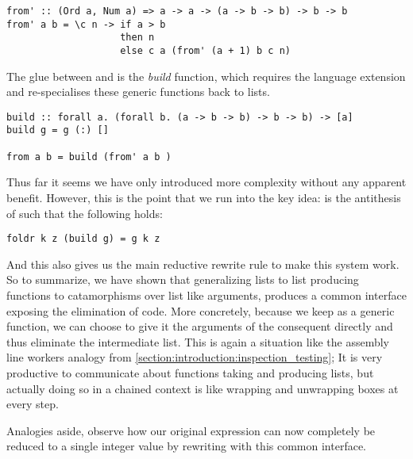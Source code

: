 \begin{listing}[H]
\begin{verbatim}
from' :: (Ord a, Num a) => a -> a -> (a -> b -> b) -> b -> b
from' a b = \c n -> if a > b
                    then n
                    else c a (from' (a + 1) b c n)
\end{verbatim}
\end{listing}

The glue between  and  is the \textit{build} function, which requires the  language extension
and re-specialises these generic functions back to lists.

\begin{listing}[H]
\begin{verbatim}
build :: forall a. (forall b. (a -> b -> b) -> b -> b) -> [a]
build g = g (:) []

from a b = build (from' a b )
\end{verbatim}
\end{listing}

Thus far it seems we have only introduced more complexity without any apparent benefit. 
However, this is the point that we run into the key idea:  is the antithesis of  such that the following holds:

\begin{listing}[H]
\begin{verbatim}
foldr k z (build g) = g k z
\end{verbatim}
\end{listing}

And this also gives us the main reductive rewrite rule to make this system work.
So to summarize, we have shown that generalizing lists to list producing functions to catamorphisms
over list like arguments, produces a common interface exposing the elimination of code. More concretely,
because we keep  as a generic function, we can choose to give it the arguments of the consequent
 directly and thus eliminate the intermediate list. This is again a situation like the assembly line
workers analogy from \cref{section:introduction:inspection_testing}; It is very productive to communicate about
functions taking and producing lists, but actually doing so in a chained context is like wrapping and unwrapping
boxes at every step.

Analogies aside, observe how our original expression can now completely be reduced to a single integer value
by rewriting  with this common interface.

